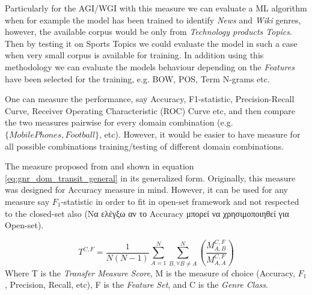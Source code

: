 Particularly for the AGI/WGI with this measure we can evaluate a ML algorithm when for example the model has been trained to identify \textit{News} and \textit{Wiki} genres, however, the available corpus would be only from \textit{Technology products Topics}. Then by testing it on {Sports Topics} we could evaluate the model in such a case when very small corpus is available for training. In addition using this methodology we can evaluate the models behaviour depending on the \textit{Features} have been selected for the training, e.g. BOW, POS, Term N-grams etc. 

One can measure the performance, say Accuracy, F1-statistic, Precision-Recall Curve,  Receiver Operating Characteristic (ROC) Curve etc, and then compare the two measures pairwise for every domain combination (e.g. $\{Mobile Phones, Football\}$, etc). However, it would be easier to have measure for all possible combinations training/testing of different domain combinations. 

The measure proposed from \parencite{finn2006learning} and shown in equation \ref{eq:gnr_dom_transit_general} in its generalized form. Originally, this measure was designed for Accuracy measure in mind. However, it can be used for any measure say $F_{1}$-statistic in order to fit in open-set framework and not respected to the closed-set also (Να ελέγξω αν το Accuracy μπορεί να χρησιμοποιηθεί για Open-set). 

\begin{equation} \label{eq:office_doc_ensemble}
	T^{C,F} = \frac{1}{N(N-1)} \sum_{A=1}^{N} \sum_{B, \forall B \neq A}^{N} \left(  \frac{M^{C,F}_{A,B}}{M^{C,F}_{A,A}} \right)
    \end{equation}
Where T is the \textit{Transfer Measure Score}, M is the measure of choice (Accuracy, $F_1$, Precision, Recall, etc), F is the \textit{Feature Set}, and C is the \textit{Genre Class}. 
























